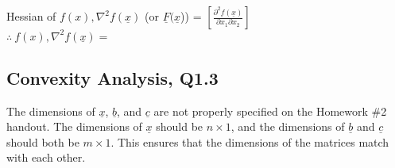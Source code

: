 \documentclass[letter,12pt]{article}
\begin{document}
Hessian of $f(x), \nabla^{2} f(\underline{x})$ (or $\underline{F}(\underline{x}$)) = $ \left[ \frac{\partial^{2} f(\underline{x})}{\partial x_{1} \partial x_{2}} \right]$ \cite[\S A.6, pp. 512]{Luenberger2008} \\
$\therefore\ f(x), \nabla^{2} f(\underline{x}) = $\\











\subsection{Convexity Analysis, Q1.3}
\label{ssec:q1c}

The dimensions of $\underline{x}$, $\underline{b}$, and $\underline{c}$ are not properly specified on the Homework \#2 handout. The dimensions of $\underline{x}$ should be $n \times 1$, and the dimensions of $\underline{b}$ and $\underline{c}$ should both be $m \times 1$. This ensures that the dimensions of the matrices match with each other. \\
\end{document}
